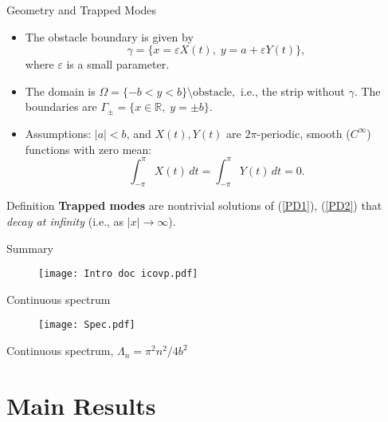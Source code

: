 \documentclass{beamer}
\begin{document}
\begin{frame}{Geometry and Trapped Modes}
\begin{itemize}
    \item The obstacle boundary is given by
    \[
    \gamma = \Big\lbrace x = \varepsilon X(t), \; y = a + \varepsilon Y(t)\Big\rbrace,
    \]
    where $\varepsilon$ is a small parameter.
    
    \item The domain is $
    \Omega = \{ -b < y < b \} \setminus \text{obstacle},
    $
    i.e., the strip without $\gamma$.  
    The boundaries are $
    \Gamma_{\pm} = \Big\lbrace x \in \mathbb{R}, \; y = \pm b \Big\rbrace.
    $

    \item Assumptions:  
    $|a| < b$, and $X(t), Y(t)$ are $2\pi$-periodic, smooth ($C^\infty$) functions with zero mean:
    \[
    \int_{-\pi}^{\pi} X(t)\,dt = \int_{-\pi}^{\pi} Y(t)\,dt = 0.
    \]
\end{itemize}


\begin{block}{Definition}
\textbf{Trapped modes} are nontrivial solutions of (\ref{PD1}), (\ref{PD2}) that \emph{decay at infinity} (i.e., as $|x|\to\infty$).
\end{block}

\end{frame}


\begin{frame} {Summary}
\begin{figure}[htbp]
\centering
\texttt{[image: Intro doc icovp.pdf]}
\end{figure}
\end{frame}




\begin{frame}{Continuous spectrum}
\begin{figure}[htbp]
\centering
\texttt{[image: Spec.pdf]}
\end{figure}
\centerline{Continuous spectrum, $\Lambda_n=\pi^2n^2/4b^2$}
\end{frame}



\section{Main Results}
\end{document}
